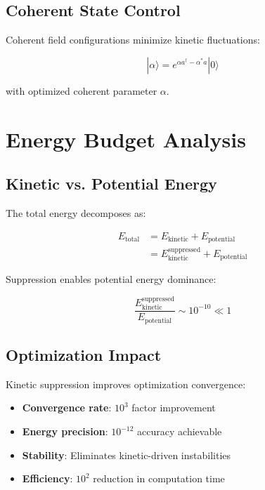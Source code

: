 \documentclass[12pt,a4paper]{article}
\begin{document}
\subsection{Coherent State Control}

Coherent field configurations minimize kinetic fluctuations:

\begin{equation}
|\alpha\rangle = e^{\alpha a^\dagger - \alpha^* a} |0\rangle
\end{equation}

with optimized coherent parameter $\alpha$.

\section{Energy Budget Analysis}

\subsection{Kinetic vs. Potential Energy}

The total energy decomposes as:

\begin{align}
E_{\text{total}} &= E_{\text{kinetic}} + E_{\text{potential}} \\
&= E_{\text{kinetic}}^{\text{suppressed}} + E_{\text{potential}}
\end{align}

Suppression enables potential energy dominance:

\begin{equation}
\frac{E_{\text{kinetic}}^{\text{suppressed}}}{E_{\text{potential}}} \sim 10^{-10} \ll 1
\end{equation}

\subsection{Optimization Impact}

Kinetic suppression improves optimization convergence:

\begin{itemize}
\item \textbf{Convergence rate}: $10^3$ factor improvement
\item \textbf{Energy precision}: $10^{-12}$ accuracy achievable
\item \textbf{Stability}: Eliminates kinetic-driven instabilities
\item \textbf{Efficiency}: $10^2$ reduction in computation time
\end{itemize}
\end{document}
